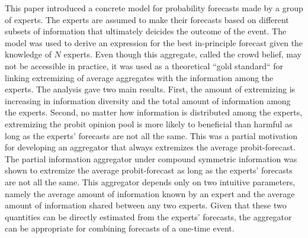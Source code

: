\documentclass[11pt]{article}
\theoremstyle{definition}
\theoremstyle{definition}
\begin{document}


This paper introduced a concrete model for probability forecasts made by a group of experts. The experts are assumed to make their forecasts based on different subsets of information that ultimately deicides the outcome of the event. The model was used to derive an expression for the best in-principle forecast given the knowledge of $N$ experts. Even though this aggregate, called the crowd belief, may not be accessible in practice, it was used as a theoretical ``gold standard`` for linking extremizing of average aggregates with the information among the experts. The analysis gave two main results. First, the amount of extremizing is increasing in information diversity and the total amount of information among the experts. Second, no matter how information is distributed among the experts, extremizing the probit opinion pool is more likely to beneficial than harmful as long as the experts' forecasts are not all the same. This was a partial motivation for developing an aggregator that always extremizes the average probit-forecast. The partial information aggregator under compound symmetric information was shown to extremize the average probit-forecast as long as the experts' forecasts are not all the same. This aggregator depends only on two intuitive parameters, namely the average amount of information known by an expert and the average amount of information shared between any two experts. Given that these two quantities can be directly estimated from the experts' forecasts, the aggregator can be appropriate for combining forecasts of a one-time event. 
\end{document}
